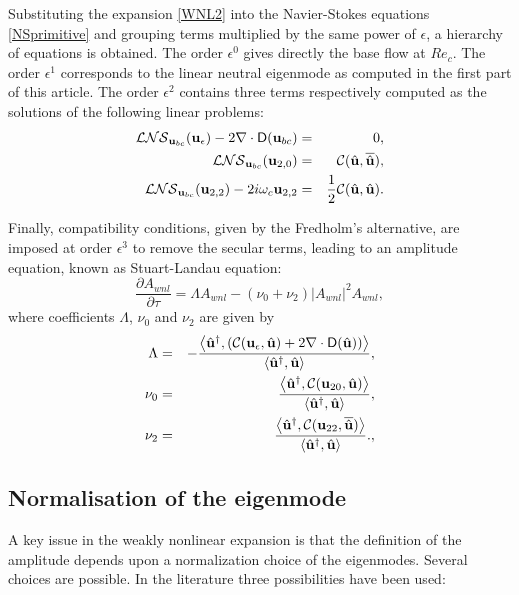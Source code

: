 \documentclass[twocolumn,10pt]{asme2ej}
\newcommand{\be}[1]{ \begin{equation} \label{#1}}
\newcommand{\ee}{\end{equation}}
\begin{document}
Substituting the expansion \ref{WNL2} into the Navier-Stokes equations \ref{NSprimitive} and grouping terms multiplied by the same power of $\epsilon$, a hierarchy of equations is obtained. The order $\epsilon^0$ gives directly the base flow at $Re_c$. The order $\epsilon^1$
corresponds to the linear neutral eigenmode as computed in the first part of this article.
The order $\epsilon^2$ contains three terms respectively computed as the solutions of the following linear problems:
\begin{eqnarray}
 {\cal LNS}_{{\bf u}_{bc}} ({\bf u}_\epsilon) - 2 \nabla \cdot {\mathsf D}({\bf u}_{bc}) &=&0,
\label{eq:LL1} \\
{\cal LNS}_{{\bf u}_{bc}} ({\bf u}_{2,0}) &=& {\cal C}(\hat{\bf u},\overline{\hat{\bf u}}), \label{eq:LL2} \\
{\cal LNS}_{{\bf u}_{bc}} ({\bf u}_{2,2}) - 2 i \omega_c {\bf u}_{2,2}  &=& \frac{1}{2} {\cal C}(\hat{\bf u},\hat{\bf u}). \label{eq:LL3}
 \end{eqnarray}

Finally, compatibility conditions, given by the Fredholm's alternative, are imposed at order $\epsilon^3$ to remove the secular terms, leading to an amplitude equation, known as Stuart-Landau equation:
\be{WNL3_2}
\frac{\partial A_{wnl}}{\partial \tau} = \Lambda A_{wnl} - (\nu_0+\nu_2)  |A_{wnl}|^2 A_{wnl},
\ee
where coefficients $\Lambda$, $\nu_0$ and $\nu_2$ are given by
\begin{eqnarray}
\Lambda &=& -\frac{ \left< {\hat{\bf u}}^\dag, 
\left( {\cal C}({\bf u}_\epsilon, \hat{\bf u}) + 2 \nabla \cdot  {\mathsf D}( \hat{\bf u}) \right) \right>}
{  \left<  \hat{\bf u}^\dag,\hat{\bf u} \right> },\label{LAMBDA}\\
\nu_0 &=& \frac{ \left< {\hat{\bf u}}^\dag,  {\cal C}({\bf u}_{20}, \hat{\bf u} ) \right>}
{  \left<  \hat{\bf u}^\dag,\hat{\bf u} \right> },\label{NU0}\\
\nu_2 &=& \frac{ \left< {\hat{\bf u}}^\dag,  {\cal C}({\bf u}_{22}, \overline{\hat{\bf u}})  \right>}
{  \left<  \hat{\bf u}^\dag,\hat{\bf u} \right> }.,\label{NU2}
 \end{eqnarray}


\subsection{Normalisation of the eigenmode}

A key issue in the weakly nonlinear expansion is that the definition of the amplitude depends upon a normalization choice of the eigenmodes. Several choices are possible. In the literature three possibilities have been used:
\end{document}
